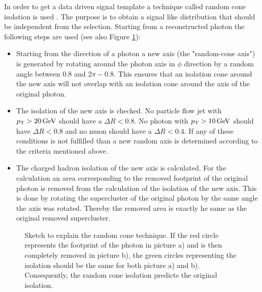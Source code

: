 In order to get a data driven signal template a technique called random cone isolation is used \cite{Chatrchyan:2011qt}. The purpose is to obtain a signal like distribution that should be independent from the selection. Starting from a reconstructed photon the following steps are used (see also Figure \ref{fig_ttg_fit_raco}):\\
\begin{itemize}
\item Starting from the direction of a photon a new axis (the "random-cone axis") is generated by rotating around the photon axis in $\phi$ direction by a random angle between $0.8$ and $2 \pi - 0.8$. This ensures that an isolation cone around the new axis will not overlap with an isolation cone around the axis of the original photon.
\item The isolation of the new axis is checked. No particle flow jet with $p_{\mathrm{T}} > \SI{20}{\giga \electronvolt}$ should have a $\Delta R < 0.8$. No photon with $p_{\mathrm{T}} > \SI{10}{\giga \electronvolt}$ should have $\Delta R < 0.8$ and no muon should have a $\Delta R < 0.4$. If any of these conditions is not fulfilled than a new random axis is determined according to the criteria mentioned above. 
\item The charged hadron isolation of the new axis is calculated. For the calculation an area corresponding to the removed footprint of the original photon is removed from the calculation of the isolation of the new axis. This is done by rotating the supercluster of the original photon by the same angle the axis was rotated. Thereby the removed area is exactly he same as the original removed supercluster.
\end{itemize}

\begin{figure}[ht]
  \caption{Sketch to explain the random cone technique. If the red circle represents the footprint of the photon in picture a) and is then completely removed in picture b), the green circles representing the isolation should be the same for both picture a) and b). Consequently, the random cone isolation predicts the original isolation. \cite{RandCone_Talk} \cite{RandCone_AN}}
  \label{fig_ttg_fit_raco}
\end{figure}

